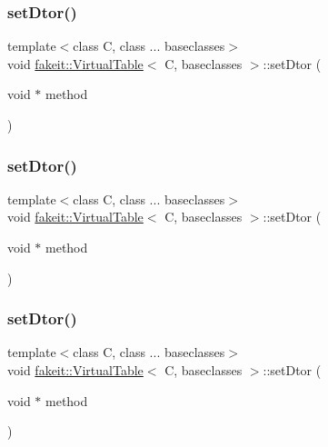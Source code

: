 \subsubsection{\texorpdfstring{setDtor()}{setDtor()}\hspace{0.1cm}{\footnotesize\ttfamily [2/10]}}
{\footnotesize\ttfamily template$<$class C, class ... baseclasses$>$ \\
void \mbox{\hyperlink{structfakeit_1_1VirtualTable}{fakeit\+::\+Virtual\+Table}}$<$ C, baseclasses $>$\+::set\+Dtor (\begin{DoxyParamCaption}\item[{void $\ast$}]{method }\end{DoxyParamCaption})\hspace{0.3cm}{\ttfamily [inline]}}

\mbox{\label{structfakeit_1_1VirtualTable_adee13076280ff9bd4c06b5f1e62d6708}} 
\subsubsection{\texorpdfstring{setDtor()}{setDtor()}\hspace{0.1cm}{\footnotesize\ttfamily [3/10]}}
{\footnotesize\ttfamily template$<$class C, class ... baseclasses$>$ \\
void \mbox{\hyperlink{structfakeit_1_1VirtualTable}{fakeit\+::\+Virtual\+Table}}$<$ C, baseclasses $>$\+::set\+Dtor (\begin{DoxyParamCaption}\item[{void $\ast$}]{method }\end{DoxyParamCaption})\hspace{0.3cm}{\ttfamily [inline]}}

\mbox{\label{structfakeit_1_1VirtualTable_adee13076280ff9bd4c06b5f1e62d6708}} 
\subsubsection{\texorpdfstring{setDtor()}{setDtor()}\hspace{0.1cm}{\footnotesize\ttfamily [4/10]}}
{\footnotesize\ttfamily template$<$class C, class ... baseclasses$>$ \\
void \mbox{\hyperlink{structfakeit_1_1VirtualTable}{fakeit\+::\+Virtual\+Table}}$<$ C, baseclasses $>$\+::set\+Dtor (\begin{DoxyParamCaption}\item[{void $\ast$}]{method }\end{DoxyParamCaption})\hspace{0.3cm}{\ttfamily [inline]}}

